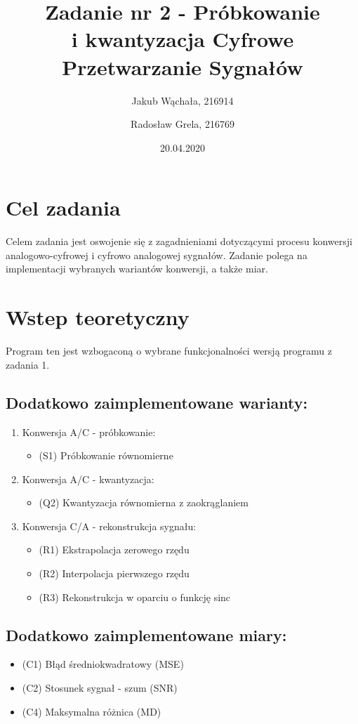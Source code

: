 \documentclass[12pt]{article}
\title{{\bf Zadanie nr 2 - Próbkowanie \\ i kwantyzacja}\linebreak
Cyfrowe Przetwarzanie Sygnałów}
\author{Jakub Wąchała, 216914 \and Radosław Grela, 216769}
\date{20.04.2020}
\begin{document}
\clearpage\maketitle
\thispagestyle{empty}
\newpage
\setcounter{page}{1}
\section{Cel zadania}
\label{cel}
Celem zadania jest oswojenie się z zagadnieniami dotyczącymi procesu konwersji analogowo-cyfrowej i cyfrowo analogowej sygnałów. Zadanie polega na implementacji wybranych wariantów konwersji, a także miar. 

\section{Wstep teoretyczny}
Program ten jest wzbogaconą o wybrane funkcjonalności wersją programu z zadania 1.
\subsection {Dodatkowo zaimplementowane warianty:}
\begin {enumerate}
\item Konwersja A/C - próbkowanie:
\begin {itemize}
 \item (S1) Próbkowanie równomierne
\end {itemize}
\item Konwersja A/C - kwantyzacja:
\begin {itemize}
\item (Q2) Kwantyzacja równomierna z zaokrąglaniem
\end {itemize}
\item Konwersja C/A - rekonstrukcja sygnału:

\begin {itemize}
\item (R1) Ekstrapolacja zerowego rzędu
\item (R2) Interpolacja pierwszego rzędu
\item (R3) Rekonstrukcja w oparciu o funkcję sinc
\end {itemize}
\end{enumerate}
\subsection {Dodatkowo zaimplementowane miary:}
\label{miary}
\begin {itemize}
\item  (C1) Błąd średniokwadratowy (MSE)
\item (C2) Stosunek sygnał - szum (SNR)
\item (C4) Maksymalna różnica (MD)
\end {itemize}
\begin{figure}[H]


\end{figure}
\end{document}
